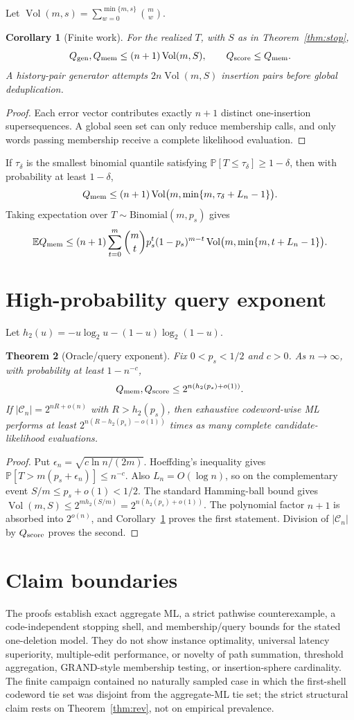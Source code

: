 \documentclass[11pt]{article}
\newtheorem{theorem}{Theorem}
\newtheorem{corollary}[theorem]{Corollary}
\theoremstyle{remark}\newtheorem{remark}[theorem]{Remark}
\newcommand{\C}{\mathcal C}\newcommand{\I}{\mathcal I}\newcommand{\one}{\mathbf 1}
\newcommand{\Prb}{\mathbb P}\newcommand{\ML}{\operatorname{ML}}
\newcommand{\Vol}{\operatorname{Vol}}\newcommand{\wt}{\operatorname{wt}}
\begin{document}
Let $\Vol(m,s)=\sum_{w=0}^{\min\{m,s\}}\binom mw$.
\begin{corollary}[Finite work]\label{cor:work}
For the realized $T$, with $S$ as in Theorem~\ref{thm:stop},
\[
 Q_{\rm gen},Q_{\rm mem}\le(n+1)\Vol(m,S),\qquad Q_{\rm score}\le Q_{\rm mem}.
\]
A history-pair generator attempts $2n\Vol(m,S)$ insertion pairs before global deduplication.
\end{corollary}
\begin{proof}
Each error vector contributes exactly $n+1$ distinct one-insertion supersequences. A global seen set
can only reduce membership calls, and only words passing membership receive a complete likelihood
evaluation.
\end{proof}

If $\tau_\delta$ is the smallest binomial quantile satisfying $\Prb[T\le\tau_\delta]\ge1-\delta$,
then with probability at least $1-\delta$,
\[
 Q_{\rm mem}\le(n+1)\Vol\bigl(m,\min\{m,\tau_\delta+L_n-1\}\bigr).
\]
Taking expectation over $T\sim\mathrm{Binomial}(m,p_s)$ gives
\[
 \mathbb E Q_{\rm mem}\le(n+1)\sum_{t=0}^{m}\binom mtp_s^t(1-p_s)^{m-t}
 \Vol\bigl(m,\min\{m,t+L_n-1\}\bigr).
\]

\section{High-probability query exponent}
Let $h_2(u)=-u\log_2u-(1-u)\log_2(1-u)$.
\begin{theorem}[Oracle/query exponent]\label{thm:exp}
Fix $0<p_s<1/2$ and $c>0$. As $n\to\infty$, with probability at least $1-n^{-c}$,
\[
 Q_{\rm mem},Q_{\rm score}\le2^{n(h_2(p_s)+o(1))}.
\]
If $|\C_n|=2^{nR+o(n)}$ with $R>h_2(p_s)$, then exhaustive codeword-wise ML performs at least
$2^{n(R-h_2(p_s)-o(1))}$ times as many complete candidate-likelihood evaluations.
\end{theorem}
\begin{proof}
Put $\epsilon_n=\sqrt{c\ln n/(2m)}$. Hoeffding's inequality gives
$\Prb[T>m(p_s+\epsilon_n)]\le n^{-c}$. Also $L_n=O(\log n)$, so on the complementary event
$S/m\le p_s+o(1)<1/2$. The standard Hamming-ball bound gives
$\Vol(m,S)\le2^{mh_2(S/m)}=2^{n(h_2(p_s)+o(1))}$. The polynomial factor $n+1$ is absorbed into
$2^{o(n)}$, and Corollary~\ref{cor:work} proves the first statement. Division of
$|\C_n|$ by $Q_{\rm score}$ proves the second.
\end{proof}

\section{Claim boundaries}
The proofs establish exact aggregate ML, a strict pathwise counterexample, a code-independent
stopping shell, and membership/query bounds for the stated one-deletion model. They do not show
instance optimality, universal latency superiority, multiple-edit performance, or novelty of
path summation, threshold aggregation, GRAND-style membership testing, or insertion-sphere
cardinality. The finite campaign contained no naturally sampled case in which the first-shell
codeword tie set was disjoint from the aggregate-ML tie set; the strict structural claim rests on
Theorem~\ref{thm:rev}, not on empirical prevalence.
\end{document}
